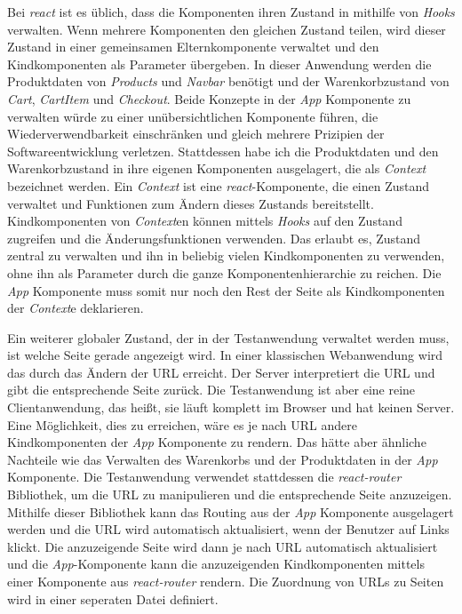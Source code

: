 Bei \textit{react} ist es üblich, dass die Komponenten ihren Zustand in mithilfe von \textit{Hooks} verwalten.
Wenn mehrere Komponenten den gleichen Zustand teilen, wird dieser Zustand in einer gemeinsamen Elternkomponente verwaltet und den Kindkomponenten als Parameter übergeben.
In dieser Anwendung werden die Produktdaten von \textit{Products} und \textit{Navbar} benötigt und der Warenkorbzustand von \textit{Cart}, \textit{CartItem} und \textit{Checkout}.
Beide Konzepte in der \textit{App} Komponente zu verwalten würde zu einer unübersichtlichen Komponente führen, die Wiederverwendbarkeit einschränken und gleich mehrere Prizipien der Softwareentwicklung verletzen.
Stattdessen habe ich die Produktdaten und den Warenkorbzustand in ihre eigenen Komponenten ausgelagert, die als \textit{Context} bezeichnet werden.
Ein \textit{Context} ist eine \textit{react}-Komponente, die einen Zustand verwaltet und Funktionen zum Ändern dieses Zustands bereitstellt.
Kindkomponenten von \textit{Context}en können mittels \textit{Hooks} auf den Zustand zugreifen und die Änderungsfunktionen verwenden.
Das erlaubt es, Zustand zentral zu verwalten und ihn in beliebig vielen Kindkomponenten zu verwenden, ohne ihn als Parameter durch die ganze Komponentenhierarchie zu reichen.
Die \textit{App} Komponente muss somit nur noch den Rest der Seite als Kindkomponenten der \textit{Context}e deklarieren.

Ein weiterer globaler Zustand, der in der Testanwendung verwaltet werden muss, ist welche Seite gerade angezeigt wird.
In einer klassischen Webanwendung wird das durch das Ändern der URL erreicht.
Der Server interpretiert die URL und gibt die entsprechende Seite zurück.
Die Testanwendung ist aber eine reine Clientanwendung, das heißt, sie läuft komplett im Browser und hat keinen Server.
Eine Möglichkeit, dies zu erreichen, wäre es je nach URL andere Kindkomponenten der \textit{App} Komponente zu rendern.
Das hätte aber ähnliche Nachteile wie das Verwalten des Warenkorbs und der Produktdaten in der \textit{App} Komponente.
Die Testanwendung verwendet stattdessen die \textit{react-router} Bibliothek, um die URL zu manipulieren und die entsprechende Seite anzuzeigen.
Mithilfe dieser Bibliothek kann das Routing aus der \textit{App} Komponente ausgelagert werden und die URL wird automatisch aktualisiert, wenn der Benutzer auf Links klickt.
Die anzuzeigende Seite wird dann je nach URL automatisch aktualisiert und die \textit{App}-Komponente kann die anzuzeigenden Kindkomponenten mittels einer Komponente aus \textit{react-router} rendern.
Die Zuordnung von URLs zu Seiten wird in einer seperaten Datei definiert.

